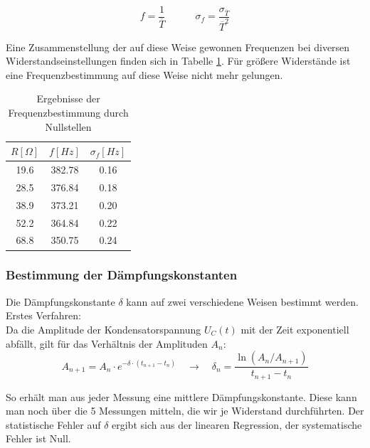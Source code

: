 \documentclass[12pt,a4paper]{article}
\begin{document}
\begin{equation}
f=\frac{1}{\overline{T}} \quad \quad \quad
\sigma_f=\frac{\sigma_{\overline{T}}}{\overline{T}^2}
\end{equation}

Eine Zusammenstellung der auf diese Weise gewonnen Frequenzen bei diversen Widerstandseinstellungen finden sich in Tabelle \ref{tab:Frequenzen}. Für größere Widerstände ist eine Frequenzbestimmung auf diese Weise nicht mehr gelungen.

\begin{table}
\begin{center}
\begin{tabular}{|c|c|c|}
\hline
$R[\Omega]$ & $f[Hz]$ & $\sigma_f[Hz]$ \\
\hline
 19.6 & 382.78 & 0.16\\
\hline
 28.5 & 376.84 & 0.18\\
\hline
 38.9 & 373.21 & 0.20\\
\hline
 52.2 & 364.84 & 0.22\\
\hline
 68.8 & 350.75 & 0.24\\
\hline
\end{tabular}
\end{center}
\caption{Ergebnisse der Frequenzbestimmung durch Nullstellen}
\label{tab:Frequenzen}
\end{table}



\subsubsection{Bestimmung der Dämpfungskonstanten}
Die Dämpfungskonstante $\delta$ kann auf zwei verschiedene Weisen bestimmt werden.\\

Erstes Verfahren:\\
Da die Amplitude der Kondensatorspannung $U_C(t)$ mit der Zeit exponentiell abfällt, gilt für das Verhältnis der Amplituden $A_n$:
\begin{equation}
A_{n+1} = A_n \cdot e^{-\delta \cdot (t_{n+1} - t_n)} \quad \rightarrow \quad \delta_n = \frac{\ln ( A_n / A_{n+1})}{t_{n+1}-t_n}
\end{equation}

So erhält man aus jeder Messung eine mittlere Dämpfungskonstante. Diese kann man noch über die 5 Messungen mitteln, die wir je Widerstand durchführten. Der statistische Fehler auf $\delta$ ergibt sich aus der linearen Regression, der systematische Fehler ist Null.\\
\end{document}
